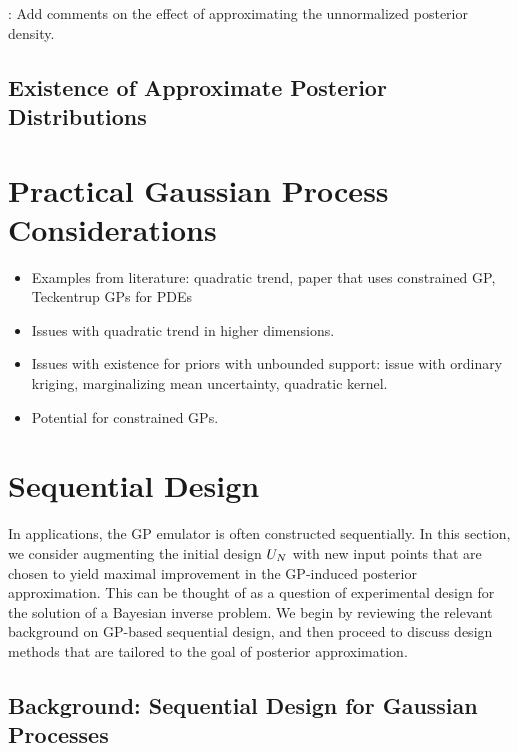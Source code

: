 \documentclass[12pt]{article}
\begin{document}
\todo: Add comments on the effect of approximating the unnormalized posterior density. 


\subsection{Existence of Approximate Posterior Distributions} \label{post_existence}
\todo

\section{Practical Gaussian Process Considerations}
\begin{itemize}
\item Examples from literature: quadratic trend, paper that uses constrained GP, Teckentrup GPs for PDEs
\item Issues with quadratic trend in higher dimensions. 
\item Issues with existence for priors with unbounded support: issue with ordinary kriging, marginalizing mean 
uncertainty, quadratic kernel. 
\item Potential for constrained GPs.
\end{itemize}

\section{Sequential Design} \label{seq_des}
In applications, the GP emulator is often constructed sequentially. In this section, we consider augmenting the 
initial design $\designIn[\Ndesign]$ with new input points that are chosen to yield maximal improvement in the 
GP-induced posterior approximation. This can be thought of as a question of experimental design for the 
solution of a Bayesian inverse problem. We begin by reviewing the relevant background on GP-based 
sequential design, and then proceed to discuss design methods that are tailored to the goal of 
posterior approximation.  

\subsection{Background: Sequential Design for Gaussian Processes}
\end{document}
